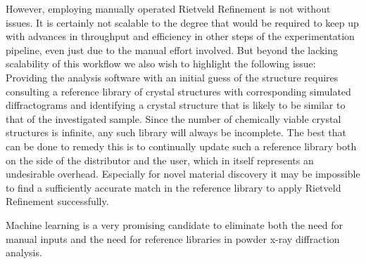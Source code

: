 However, employing manually operated Rietveld Refinement is not without issues.
It is certainly not scalable to the degree that would be required to keep up with advances
in throughput and efficiency in other steps of the experimentation pipeline, even just due to the manual effort involved.
But beyond the lacking scalability of this workflow we also wish to highlight the following issue:
Providing the analysis software with an initial guess of the structure requires consulting a reference library
of crystal structures with corresponding simulated diffractograms and
identifying a crystal structure that is likely to be similar to that of the investigated sample.
Since the number of chemically viable crystal structures is infinite, any such library will always be incomplete.
The best that can be done to remedy this is to continually update such a reference library both on the side
of the distributor and the user, which in itself represents an undesirable overhead.
Especially for novel material discovery it may be impossible to find a sufficiently accurate match in the reference
library to apply Rietveld Refinement successfully.

Machine learning is a very promising candidate to eliminate both the need for manual inputs and the need for reference
libraries in powder x-ray diffraction analysis. 










